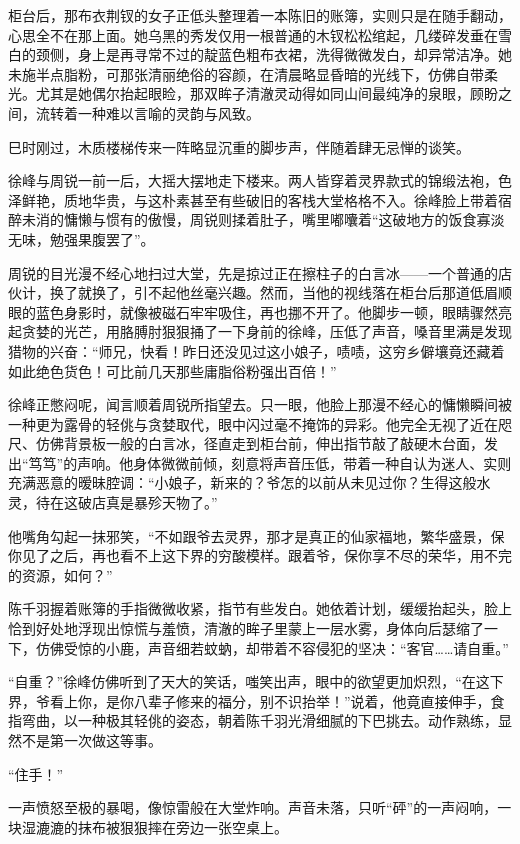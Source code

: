 柜台后，那布衣荆钗的女子正低头整理着一本陈旧的账簿，实则只是在随手翻动，心思全不在那上面。她乌黑的秀发仅用一根普通的木钗松松绾起，几缕碎发垂在雪白的颈侧，身上是再寻常不过的靛蓝色粗布衣裙，洗得微微发白，却异常洁净。她未施半点脂粉，可那张清丽绝俗的容颜，在清晨略显昏暗的光线下，仿佛自带柔光。尤其是她偶尔抬起眼睑，那双眸子清澈灵动得如同山间最纯净的泉眼，顾盼之间，流转着一种难以言喻的灵韵与风致。

巳时刚过，木质楼梯传来一阵略显沉重的脚步声，伴随着肆无忌惮的谈笑。

徐峰与周锐一前一后，大摇大摆地走下楼来。两人皆穿着灵界款式的锦缎法袍，色泽鲜艳，质地华贵，与这朴素甚至有些破旧的客栈大堂格格不入。徐峰脸上带着宿醉未消的慵懒与惯有的傲慢，周锐则揉着肚子，嘴里嘟囔着“这破地方的饭食寡淡无味，勉强果腹罢了”。

周锐的目光漫不经心地扫过大堂，先是掠过正在擦柱子的白言冰——一个普通的店伙计，换了就换了，引不起他丝毫兴趣。然而，当他的视线落在柜台后那道低眉顺眼的蓝色身影时，就像被磁石牢牢吸住，再也挪不开了。他脚步一顿，眼睛骤然亮起贪婪的光芒，用胳膊肘狠狠捅了一下身前的徐峰，压低了声音，嗓音里满是发现猎物的兴奋：“师兄，快看！昨日还没见过这小娘子，啧啧，这穷乡僻壤竟还藏着如此绝色货色！可比前几天那些庸脂俗粉强出百倍！”

徐峰正憋闷呢，闻言顺着周锐所指望去。只一眼，他脸上那漫不经心的慵懒瞬间被一种更为露骨的轻佻与贪婪取代，眼中闪过毫不掩饰的异彩。他完全无视了近在咫尺、仿佛背景板一般的白言冰，径直走到柜台前，伸出指节敲了敲硬木台面，发出“笃笃”的声响。他身体微微前倾，刻意将声音压低，带着一种自认为迷人、实则充满恶意的暧昧腔调：“小娘子，新来的？爷怎的以前从未见过你？生得这般水灵，待在这破店真是暴殄天物了。”

他嘴角勾起一抹邪笑，“不如跟爷去灵界，那才是真正的仙家福地，繁华盛景，保你见了之后，再也看不上这下界的穷酸模样。跟着爷，保你享不尽的荣华，用不完的资源，如何？”

陈千羽握着账簿的手指微微收紧，指节有些发白。她依着计划，缓缓抬起头，脸上恰到好处地浮现出惊慌与羞愤，清澈的眸子里蒙上一层水雾，身体向后瑟缩了一下，仿佛受惊的小鹿，声音细若蚊蚋，却带着不容侵犯的坚决：“客官……请自重。”

“自重？”徐峰仿佛听到了天大的笑话，嗤笑出声，眼中的欲望更加炽烈，“在这下界，爷看上你，是你八辈子修来的福分，别不识抬举！”说着，他竟直接伸手，食指弯曲，以一种极其轻佻的姿态，朝着陈千羽光滑细腻的下巴挑去。动作熟练，显然不是第一次做这等事。

“住手！”

一声愤怒至极的暴喝，像惊雷般在大堂炸响。声音未落，只听“砰”的一声闷响，一块湿漉漉的抹布被狠狠摔在旁边一张空桌上。

